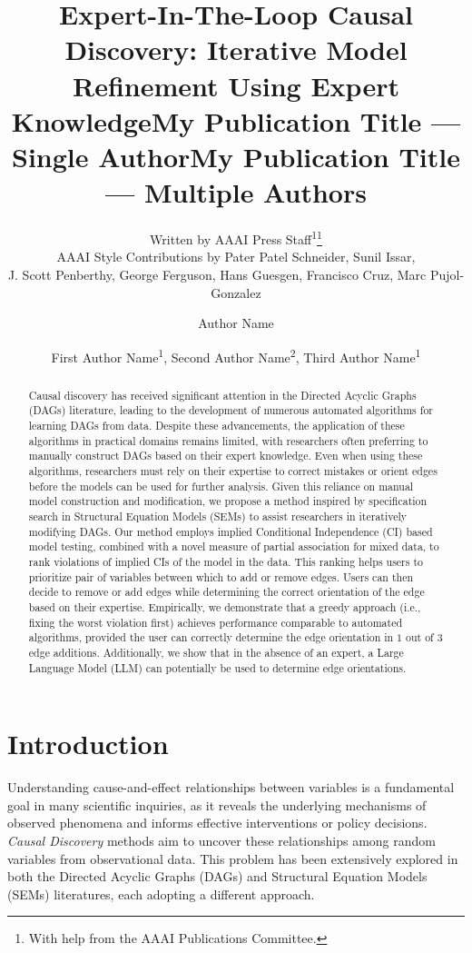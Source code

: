 \documentclass[letterpaper]{article} %
\title{Expert-In-The-Loop Causal Discovery: Iterative Model Refinement Using Expert Knowledge}
\author{
    Written by AAAI Press Staff\textsuperscript{\rm 1}\thanks{With help from the AAAI Publications Committee.}\\
    AAAI Style Contributions by Pater Patel Schneider,
    Sunil Issar,\\
    J. Scott Penberthy,
    George Ferguson,
    Hans Guesgen,
    Francisco Cruz\equalcontrib,
    Marc Pujol-Gonzalez\equalcontrib
}
\title{My Publication Title --- Single Author}
\author {
    Author Name
}
\title{My Publication Title --- Multiple Authors}
\author {
    First Author Name\textsuperscript{\rm 1},
    Second Author Name\textsuperscript{\rm 2},
    Third Author Name\textsuperscript{\rm 1}
}
\begin{document}
\maketitle

\begin{abstract}
Causal discovery has received significant attention in the Directed Acyclic
Graphs (DAGs) literature, leading to the development of numerous automated
algorithms for learning DAGs from data. Despite these advancements, the
application of these algorithms in practical domains remains limited, with
researchers often preferring to manually construct DAGs based on their expert
knowledge. Even when using these algorithms, researchers must rely on their
expertise to correct mistakes or orient edges before the models can be used for
further analysis. Given this reliance on manual model construction and
modification, we propose a method inspired by specification search in
Structural Equation Models (SEMs) to assist researchers in iteratively
modifying DAGs. Our method employs implied Conditional Independence (CI) based
model testing, combined with a novel measure of partial association for mixed
data, to rank violations of implied CIs of the model in the data. This ranking
helps users to prioritize pair of variables between which to add or remove
edges. Users can then decide to remove or add edges while determining the
correct orientation of the edge based on their expertise. Empirically, we
demonstrate that a greedy approach (i.e., fixing the worst violation first)
achieves performance comparable to automated algorithms, provided the user can
correctly determine the edge orientation in $ 1 $ out of $ 3 $ edge additions.
Additionally, we show that in the absence of an expert, a Large Language Model
(LLM) can potentially be used to determine edge orientations. 
\end{abstract}

\section{Introduction}

Understanding cause-and-effect relationships between variables is a fundamental
goal in many scientific inquiries, as it reveals the underlying mechanisms of
observed phenomena and informs effective interventions or policy decisions.
\emph{Causal Discovery} methods aim to uncover these relationships among random
variables from observational data. This problem has been extensively explored
in both the Directed Acyclic Graphs (DAGs) and Structural Equation Models
(SEMs) literatures, each adopting a different approach. 
\end{document}
